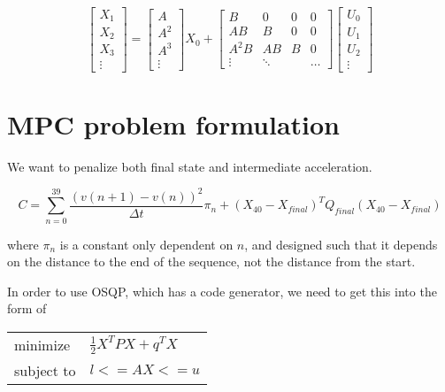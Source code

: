 \documentclass[a4paper,12pt]{article}
\begin{document}
\begin{equation}
\label{all_x}
  \begin{bmatrix} X_1 \\ X_2 \\ X_3 \\ \vdots \end{bmatrix} = 
  \begin{bmatrix} A  \\
                  A^2  \\
                  A^3  \\
                  \vdots \end{bmatrix} 
   X_0 + 
  \begin{bmatrix} B & 0 & 0 & 0 \\
                  A B & B & 0 & 0 \\
                  A^2 B & A B & B & 0 \\
                  \vdots  & \ddots & & \hdots \end{bmatrix} 
  \begin{bmatrix} U_0 \\ U_1 \\ U_2 \\ \vdots \end{bmatrix}
\end{equation}

\section{MPC problem formulation}

We want to penalize both final state and intermediate acceleration.  

\begin{equation}
C = \sum_{n=0}^{39} \frac{\left(v(n + 1) - v(n)\right)^2}{\Delta t} \pi_n + (X_{40} - X_{final})^T Q_{final} (X_{40} - X_{final})
\end{equation}

where $\pi_n$ is a constant only dependent on $n$, and designed such that it depends on the distance to the end of the sequence, not the distance from the start.

In order to use OSQP, which has a code generator, we need to get this into the form of

\begin{tabular}{ l l }
minimize &      $ \frac{1}{2} X^T P X + q^T X $ \\
subject to &    $ l <= A X <= u $ \\
\end{tabular}
\end{document}
